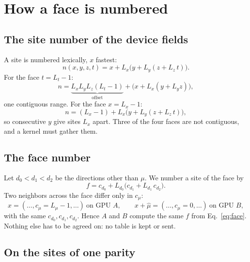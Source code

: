 \documentclass[11pt,a4paper]{article}
\numberwithin{equation}{section}
\begin{document}
\section{How a face is numbered}

\subsection{The site number of the device fields}

A site is numbered lexically, $x$ fastest:
\begin{equation}
n(x,y,z,t) = x + L_x\big(y + L_y(z + L_z\,t)\big).
\label{eq:lex}
\end{equation}
For the face $t=L_t-1$:
\begin{equation}
n = \underbrace{L_xL_yL_z(L_t-1)}_{\text{offset}} + \big(x+L_x(y+L_yz)\big),
\end{equation}
one contiguous range. For the face $x=L_x-1$:
\begin{equation}
n = (L_x-1) + L_x\big(y + L_y(z + L_z\,t)\big),
\end{equation}
so consecutive $y$ give sites $L_x$ apart. Three of the four faces are not contiguous, and a
kernel must gather them.

\subsection{The face number}

Let $d_0<d_1<d_2$ be the directions other than $\mu$. We number a site of the face by
\begin{equation}
f = c_{d_0} + L_{d_0}\big(c_{d_1} + L_{d_1}\,c_{d_2}\big).
\label{eq:face}
\end{equation}
Two neighbors across the face differ only in $c_\mu$:
\begin{equation}
x=(\dots,c_\mu=L_\mu-1,\dots)\ \text{on GPU }A,\qquad x+\hat\mu=(\dots,c_\mu=0,\dots)\ \text{on GPU }B,
\end{equation}
with the same $c_{d_0},c_{d_1},c_{d_2}$. Hence $A$ and $B$ compute the same $f$ from
Eq.~\eqref{eq:face}. Nothing else has to be agreed on: no table is kept or sent.

\subsection{On the sites of one parity}
\end{document}
